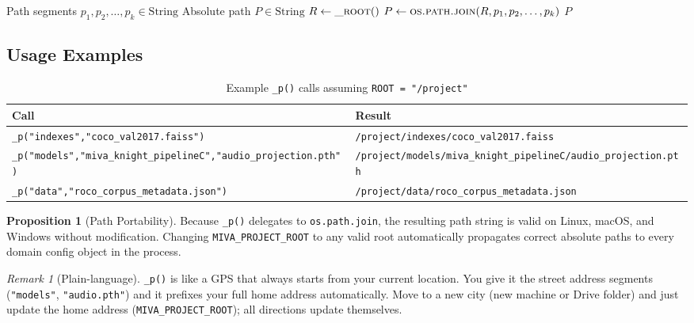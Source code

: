 \documentclass[12pt,a4paper]{article}
\theoremstyle{definition}
\newtheorem{proposition}[theorem]{Proposition}
\theoremstyle{remark}
\newtheorem{remark}[theorem]{Remark}
\begin{document}
\begin{algorithm}[H]
\caption{\texttt{\_p()} — Absolute Path Construction}
\label{alg:p}
\begin{algorithmic}[1]
\Require Path segments $p_1, p_2, \ldots, p_k \in \text{String}$
\Ensure Absolute path $P \in \text{String}$
\State $R \gets \textsc{\_root}()$
\State $P \gets \textsc{os.path.join}(R, p_1, p_2, \ldots, p_k)$
\State \Return $P$
\end{algorithmic}
\end{algorithm}

\subsection{Usage Examples}

\begin{table}[H]
\centering
\caption{Example \texttt{\_p()} calls assuming \texttt{ROOT = "/project"}}
\begin{tabular}{ll}
\toprule
Call & Result \\
\midrule
\texttt{\_p("indexes","coco\_val2017.faiss")} & \texttt{/project/indexes/coco\_val2017.faiss} \\
\texttt{\_p("models","miva\_knight\_pipelineC","audio\_projection.pth")} & \texttt{/project/models/miva\_knight\_pipelineC/audio\_projection.pth} \\
\texttt{\_p("data","roco\_corpus\_metadata.json")} & \texttt{/project/data/roco\_corpus\_metadata.json} \\
\bottomrule
\end{tabular}
\end{table}

\begin{proposition}[Path Portability]
Because \texttt{\_p()} delegates to \texttt{os.path.join}, the resulting
path string is valid on Linux, macOS, and Windows without modification.
Changing \texttt{MIVA\_PROJECT\_ROOT} to any valid root automatically
propagates correct absolute paths to every domain config object in the
process.
\end{proposition}

\begin{remark}[Plain-language]
\texttt{\_p()} is like a GPS that always starts from your current location.
You give it the street address segments (\texttt{"models"}, \texttt{"audio.pth"})
and it prefixes your full home address automatically.
Move to a new city (new machine or Drive folder) and just update the home
address (\texttt{MIVA\_PROJECT\_ROOT}); all directions update themselves.
\end{remark}
\end{document}
